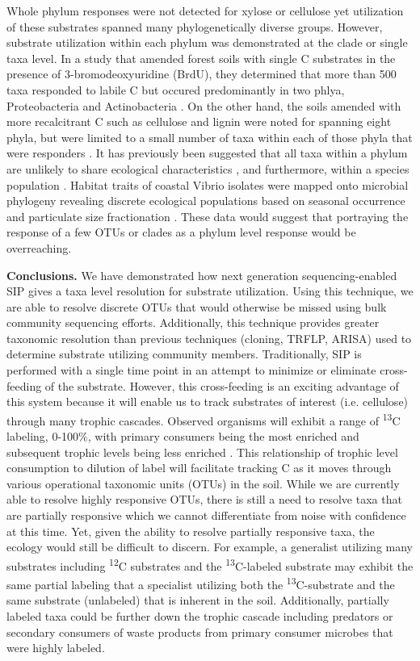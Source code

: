 Whole phylum responses were not detected for xylose or cellulose yet utilization of these substrates spanned many phylogenetically diverse groups. However, substrate utilization within each phylum was demonstrated at the clade or single taxa level. In a study that amended forest soils with single C substrates in the presence of 3-bromodeoxyuridine (BrdU), they determined that more than 500 taxa responded to labile C but occured predominantly in two phlya, Proteobacteria and Actinobacteria \cite{Goldfarb_2011}. On the other hand, the soils amended with more recalcitrant C such as cellulose and lignin were noted for spanning eight phyla, but were limited to a small number of taxa within each of those phyla that were responders \cite{Goldfarb_2011}. It has previously been suggested that all taxa within a phylum are unlikely to share ecological characteristics \cite{Fierer_2007}, and furthermore, within a species population \cite{Choudoir_2012,Preheim_2011,Hunt_2008}. Habitat traits of coastal Vibrio isolates were mapped onto microbial phylogeny revealing discrete ecological populations based on seasonal occurrence and particulate size fractionation \cite{Preheim_2011, Hunt_2008}. These data would suggest that portraying the response of a few OTUs or clades as a phylum level response would be overreaching.     

\textbf{Conclusions.} We have demonstrated how next generation sequencing-enabled SIP gives a taxa level resolution for substrate utilization. Using this technique, we are able to resolve discrete OTUs that would otherwise be missed using bulk community sequencing efforts. Additionally, this technique provides greater taxonomic resolution than previous techniques (cloning, TRFLP, ARISA) used to determine substrate utilizing community members. Traditionally, SIP is performed with a single time point in an attempt to minimize or eliminate cross-feeding of the substrate.  However, this cross-feeding is an exciting advantage of this system because it will enable us to track substrates of interest (i.e. cellulose) through many trophic cascades. Observed organisms will exhibit a range of \textsuperscript{13}C labeling, 0-100\%, with primary consumers being the most enriched and subsequent trophic levels being less enriched \cite{Morris_2002,McDonald_2005,Ziegler_2005}. This relationship of trophic level consumption to dilution of label will facilitate tracking C as it moves through various operational taxonomic units (OTUs) in the soil. While we are currently able to resolve highly responsive OTUs, there is still a need to resolve taxa that are partially responsive which we cannot differentiate from noise with confidence at this time. Yet, given the ability to resolve partially responsive taxa, the ecology would still be difficult to discern. For example, a generalist utilizing many substrates including \textsuperscript{12}C substrates and the \textsuperscript{13}C-labeled substrate may exhibit the same partial labeling that a specialist utilizing both the \textsuperscript{13}C-substrate and the same substrate (unlabeled) that is inherent in the soil. Additionally, partially labeled taxa could be further down the trophic cascade including predators or secondary consumers of waste products from primary consumer microbes that were highly labeled.   

